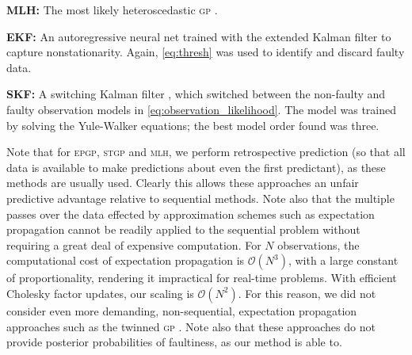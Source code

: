 \documentclass[letterpaper]{article}
\newcommand{\given}{\!\ensuremath{\mid}\!}
\newcommand{\bm}[1]{\ensuremath{\mathbf{#1}}}
\newcommand{\acro}[1]{\textsc{\MakeLowercase{#1}}}
\newcommand{\vect}[1]{\bm{#1}}
\newcommand{\vy}{\vect{y}}
\newcommand{\mean}[2]{{m}(#1\given#2)}
\begin{document}

{\bf MLH:} 
The most likely heteroscedastic  \acro{gp} \cite{kersting2007most}. 

{\bf EKF:}
An autoregressive neural net trained with the extended Kalman filter to capture nonstationarity. Again, \eqref{eq:thresh} was used to identify and discard faulty data.

{\bf SKF:}
A switching Kalman filter \cite{murphy1998switching}, which switched between the non-faulty and faulty observation models in \eqref{eq:observation_likelihood}. The model was trained by solving the Yule-Walker equations; the best model order found was three. 

Note that for \acro{epgp}, \acro{stgp} and \acro{mlh}, we perform retrospective prediction (so that all data is available to make predictions about even the first predictant), as these methods are usually used. Clearly this allows these approaches an unfair predictive advantage relative to sequential methods. Note also that the multiple passes over the data effected by approximation schemes such as expectation propagation cannot be readily applied to the sequential problem without requiring a great deal of expensive computation. For $N$ observations, the computational cost of expectation propagation is $\mathcal{O}(N^3)$, with a large constant of proportionality, rendering it impractical for real-time problems. With efficient Cholesky factor updates, our scaling is $\mathcal{O}(N^2)$. For this reason, we did not consider even more demanding, non-sequential, expectation propagation approaches such as the twinned \acro{gp} \cite{naish2008robust}. Note also that these approaches do not provide posterior probabilities of faultiness, as our method is able to. 
\end{document}
